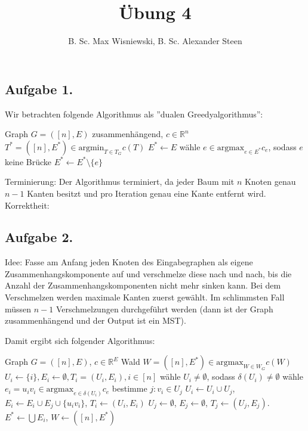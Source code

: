 \documentclass[11pt,a4paper,ngerman]{article}
\date{}
\title{Übung 4}
\author{B. Sc. Max Wisniewski, B. Sc. Alexander Steen}
\newcommand{\argmin}{\text{argmin}}
\newcommand{\argmax}{\text{argmax}}
\begin{document}

\renewcommand{\figurename}{Figure}

\maketitle
\thispagestyle{fancy}

\subsection*{Aufgabe 1.}
Wir betrachten folgende Algorithmus als ''dualen Greedyalgorithmus'':
\begin{algorithmic}[1]
\Require Graph $G = ([n],E)$ zusammenhängend, $c \in \mathbb{R}^n$
\Ensure $T^* = ([n], E^*) \in \argmin_{T \in T_G} c(T)$
\State $E^* \gets E$
  \State wähle $e \in \argmax_{e \in E^*} c_e$, sodass $e$ keine Brücke
  \State $E^* \gets E^* \setminus \{e \}$
\EndWhile
\end{algorithmic}
Terminierung: Der Algorithmus terminiert, da jeder Baum mit $n$ Knoten genau $n-1$ Kanten besitzt und
pro Iteration genau eine Kante entfernt wird. \\
Korrektheit: 

\subsection*{Aufgabe 2.}
Idee: Fasse am Anfang jeden Knoten des Eingabegraphen als eigene Zusammenhangskomponente auf und verschmelze diese nach und nach, bis die Anzahl der Zusammenhangskomponenten nicht mehr sinken kann.
Bei dem Verschmelzen werden maximale Kanten zuerst gewählt. Im schlimmsten Fall müssen $n-1$ Verschmelzungen durchgeführt werden (dann ist der Graph zusammenhängend und der Output ist ein MST).

Damit ergibt sich folgender Algorithmus:
\begin{algorithmic}[1]
\Require Graph $G = ([n],E)$, $c \in \mathbb{R}^E$
\Ensure Wald $W = ([n], E^*) \in \argmax_{W \in W_G} c(W)$
\State $U_i \gets \{ i\}, E_i \gets \emptyset, T_i = (U_i, E_i), i \in [n]$
\State wähle $U_i \neq \emptyset$, sodass $\delta(U_i) \neq \emptyset$
\State wähle $e_i = u_i v_i \in \argmax_{e \in \delta (U_i)} c_e$
\State bestimme $j: v_i \in U_j$
\State $U_i \gets U_i \cup U_j$, $E_i \gets E_i \cup E_j \cup \{u_iv_i \}$, $T_i \gets (U_i, E_i)$
\State $U_j \gets \emptyset$, $E_j \gets \emptyset$, $T_j \gets (U_j, E_j)$.
\EndFor
\State $E^* \gets \bigcup E_i$, $W \gets ([n], E^*)$
\end{algorithmic}
\end{document}
